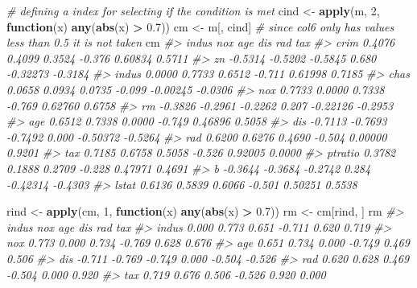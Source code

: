 \documentclass[]{book}
\newenvironment{Shaded}{\begin{snugshade}}{\end{snugshade}}
\newcommand{\CommentTok}[1]{\textcolor[rgb]{0.56,0.35,0.01}{\textit{#1}}}
\newcommand{\ControlFlowTok}[1]{\textcolor[rgb]{0.13,0.29,0.53}{\textbf{#1}}}
\newcommand{\DecValTok}[1]{\textcolor[rgb]{0.00,0.00,0.81}{#1}}
\newcommand{\FloatTok}[1]{\textcolor[rgb]{0.00,0.00,0.81}{#1}}
\newcommand{\KeywordTok}[1]{\textcolor[rgb]{0.13,0.29,0.53}{\textbf{#1}}}
\newcommand{\NormalTok}[1]{#1}
\newcommand{\OperatorTok}[1]{\textcolor[rgb]{0.81,0.36,0.00}{\textbf{#1}}}
\newcommand{\StringTok}[1]{\textcolor[rgb]{0.31,0.60,0.02}{#1}}
\begin{document}
\begin{Shaded}
\begin{Highlighting}[]
\CommentTok{# defining a index for selecting if the condition is met}
\NormalTok{cind <-}\StringTok{ }\KeywordTok{apply}\NormalTok{(m, }\DecValTok{2}\NormalTok{, }\ControlFlowTok{function}\NormalTok{(x) }\KeywordTok{any}\NormalTok{(}\KeywordTok{abs}\NormalTok{(x) }\OperatorTok{>}\StringTok{ }\FloatTok{0.7}\NormalTok{))}
\NormalTok{cm <-}\StringTok{ }\NormalTok{m[, cind] }\CommentTok{# since col6 only has values less than 0.5 it is not taken}
\NormalTok{cm}
\CommentTok{#>           indus     nox     age    dis      rad     tax}
\CommentTok{#> crim     0.4076  0.4099  0.3524 -0.376  0.60834  0.5711}
\CommentTok{#> zn      -0.5314 -0.5202 -0.5845  0.680 -0.32273 -0.3184}
\CommentTok{#> indus    0.0000  0.7733  0.6512 -0.711  0.61998  0.7185}
\CommentTok{#> chas     0.0658  0.0934  0.0735 -0.099 -0.00245 -0.0306}
\CommentTok{#> nox      0.7733  0.0000  0.7338 -0.769  0.62760  0.6758}
\CommentTok{#> rm      -0.3826 -0.2961 -0.2262  0.207 -0.22126 -0.2953}
\CommentTok{#> age      0.6512  0.7338  0.0000 -0.749  0.46896  0.5058}
\CommentTok{#> dis     -0.7113 -0.7693 -0.7492  0.000 -0.50372 -0.5264}
\CommentTok{#> rad      0.6200  0.6276  0.4690 -0.504  0.00000  0.9201}
\CommentTok{#> tax      0.7185  0.6758  0.5058 -0.526  0.92005  0.0000}
\CommentTok{#> ptratio  0.3782  0.1888  0.2709 -0.228  0.47971  0.4691}
\CommentTok{#> b       -0.3644 -0.3684 -0.2742  0.284 -0.42314 -0.4303}
\CommentTok{#> lstat    0.6136  0.5839  0.6066 -0.501  0.50251  0.5538}
\end{Highlighting}
\end{Shaded}

\begin{Shaded}
\begin{Highlighting}[]
\NormalTok{rind <-}\StringTok{ }\KeywordTok{apply}\NormalTok{(cm, }\DecValTok{1}\NormalTok{, }\ControlFlowTok{function}\NormalTok{(x) }\KeywordTok{any}\NormalTok{(}\KeywordTok{abs}\NormalTok{(x) }\OperatorTok{>}\StringTok{ }\FloatTok{0.7}\NormalTok{))  }
\NormalTok{rm <-}\StringTok{ }\NormalTok{cm[rind, ]}
\NormalTok{rm}
\CommentTok{#>        indus    nox    age    dis    rad    tax}
\CommentTok{#> indus  0.000  0.773  0.651 -0.711  0.620  0.719}
\CommentTok{#> nox    0.773  0.000  0.734 -0.769  0.628  0.676}
\CommentTok{#> age    0.651  0.734  0.000 -0.749  0.469  0.506}
\CommentTok{#> dis   -0.711 -0.769 -0.749  0.000 -0.504 -0.526}
\CommentTok{#> rad    0.620  0.628  0.469 -0.504  0.000  0.920}
\CommentTok{#> tax    0.719  0.676  0.506 -0.526  0.920  0.000}
\end{Highlighting}
\end{Shaded}
\end{document}
